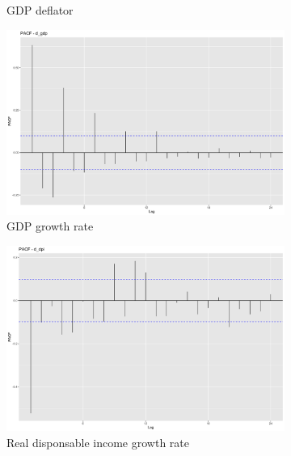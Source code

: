 \documentclass[hidelinks,12pts]{article}
\DeclareMathOperator{\1}{\mathbbm{1}}
\begin{document}
\begin{figure}[h!]
\begin{subfigure}[b]{0.45\textwidth}
        \caption*{GDP deflator}
    \end{subfigure}
    \hfill 
    \centering
    \begin{subfigure}[b]{0.45\textwidth}
        \centering
        \includegraphics[width=\textwidth]{IMAGES/pacf_gdp.png}
        \caption*{GDP growth rate}
    \end{subfigure}
    \hfill
    \begin{subfigure}[b]{0.45\textwidth}
        \centering
        \includegraphics[width=\textwidth]{IMAGES/pacf_dpi.png}
        \caption*{Real disponsable income growth rate }
    \end{subfigure}
    \hfill 
    \centering
    \begin{subfigure}[b]{0.45\textwidth}
        \centering

\end{subfigure}
\end{figure}
\end{document}

